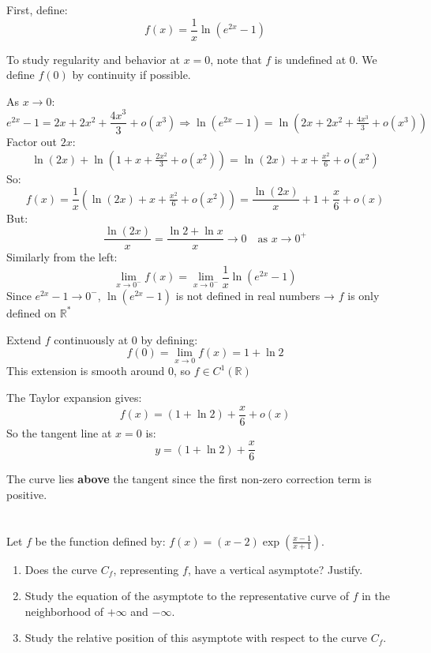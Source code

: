 \documentclass[12pt]{article}
\begin{document}
\newpage

\begin{answerbox}
    First, define:
    $$
    f(x) = \frac{1}{x} \ln(e^{2x} - 1)
    $$

    To study regularity and behavior at $ x = 0 $, note that $ f $ is undefined at 0. We define $ f(0) $ by continuity if possible.

    As $ x \to 0 $:
    $$
    e^{2x} - 1 = 2x + 2x^2 + \frac{4x^3}{3} + o(x^3)
    \Rightarrow \ln(e^{2x} - 1) = \ln(2x + 2x^2 + \tfrac{4x^3}{3} + o(x^3))
    $$
    Factor out $ 2x $:
    $$
    \ln(2x) + \ln\left(1 + x + \tfrac{2x^2}{3} + o(x^2)\right)
    = \ln(2x) + x + \tfrac{x^2}{6} + o(x^2)
    $$
    So:
    $$
    f(x) = \frac{1}{x} \left( \ln(2x) + x + \tfrac{x^2}{6} + o(x^2) \right)
    = \frac{\ln(2x)}{x} + 1 + \frac{x}{6} + o(x)
    $$
    But:
    $$
    \frac{\ln(2x)}{x} = \frac{\ln 2 + \ln x}{x} \to 0 \quad \text{as } x \to 0^+
    $$
    Similarly from the left:
    $$
    \lim_{x \to 0^-} f(x) = \lim_{x \to 0^-} \frac{1}{x} \ln(e^{2x} - 1)
    $$
    Since $ e^{2x} - 1 \to 0^- $, $ \ln(e^{2x} - 1) $ is not defined in real numbers → $ f $ is only defined on $ \mathbb{R}^* $

    Extend $ f $ continuously at 0 by defining:
    $$
    f(0) = \lim_{x \to 0} f(x) = 1 + \ln 2
    $$
    This extension is smooth around 0, so $ f \in C^1(\mathbb{R}) $

    The Taylor expansion gives:
    $$
    f(x) = (1 + \ln 2) + \frac{x}{6} + o(x)
    $$
    So the tangent line at $ x = 0 $ is:
    $$
    y = (1 + \ln 2) + \frac{x}{6}
    $$

    The curve lies \textbf{above} the tangent since the first non-zero correction term is positive.
\end{answerbox}

\newpage

\section{}
Let $f$ be the function defined by: $f(x) = (x - 2)\exp\left(\frac{x-1}{x+1}\right)$.
\begin{enumerate}
    \item Does the curve $C_f$, representing $f$, have a vertical asymptote? Justify.
    
    \item Study the equation of the asymptote to the representative curve of $f$ in the neighborhood of $+\infty$ and $-\infty$.
    
    \item Study the relative position of this asymptote with respect to the curve $C_f$.
\end{enumerate}
\end{document}
